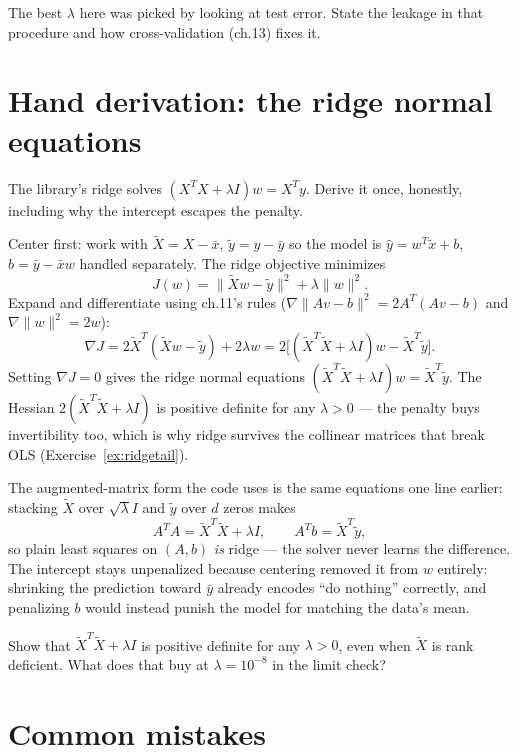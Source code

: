 \begin{exercise}[medium]
The best $\lambda$ here was picked by looking at test error. State
the leakage in that procedure and how cross-validation (ch.13)
fixes it.
\end{exercise}

\section{Hand derivation: the ridge normal
equations}\label{sec:deriv}

The library's ridge solves
$(X^TX+\lambda I)w=X^Ty$. Derive it once, honestly, including why
the intercept escapes the penalty.

Center first: work with $\tilde X=X-\bar x$, $\tilde y=y-\bar y$ so
the model is $\hat y=w^T\tilde x+b$, $b=\bar y-\bar xw$ handled
separately. The ridge objective minimizes
\[
J(w)=\|\tilde Xw-\tilde y\|^2+\lambda\|w\|^2.
\]
Expand and differentiate using ch.11's rules
($\nabla\|Av-b\|^2=2A^T(Av-b)$ and $\nabla\|w\|^2=2w$):
\[
\nabla J=2\tilde X^T(\tilde Xw-\tilde y)+2\lambda w
=2\big[(\tilde X^T\tilde X+\lambda I)w-\tilde X^T\tilde y\big].
\]
Setting $\nabla J=0$ gives the ridge normal equations
$(\tilde X^T\tilde X+\lambda I)w=\tilde X^T\tilde y$. The Hessian
$2(\tilde X^T\tilde X+\lambda I)$ is positive definite for any
$\lambda>0$ --- the penalty buys invertibility too, which is why
ridge survives the collinear matrices that break OLS
(Exercise~\ref{ex:ridgetail}).

The augmented-matrix form the code uses is the same equations one
line earlier: stacking $\tilde X$ over $\sqrt\lambda I$ and $\tilde
y$ over $d$ zeros makes
\[
A^TA=\tilde X^T\tilde X+\lambda I,\qquad
A^Tb=\tilde X^T\tilde y,
\]
so plain least squares on $(A,b)$ \emph{is} ridge --- the solver
never learns the difference. The intercept stays unpenalized because
centering removed it from $w$ entirely: shrinking the prediction
toward $\bar y$ already encodes ``do nothing'' correctly, and
penalizing $b$ would instead punish the model for matching the
data's mean.

\begin{exercise}[hard]\label{ex:ridgetail}
Show that $\tilde X^T\tilde X+\lambda I$ is positive definite for
any $\lambda>0$, even when $\tilde X$ is rank deficient. What does
that buy at $\lambda=10^{-8}$ in the limit check?
\end{exercise}

\section{Common mistakes}\label{sec:mlscratch-mistakes}

